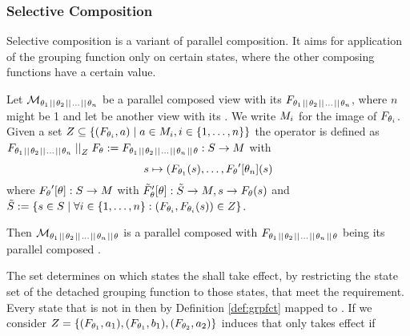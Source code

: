 \documentclass[preview]{standalone}
\begin{document}
\subsubsection{Selective Composition} \label{subsec:selecitvecomp}
Selective composition is a variant of parallel composition. It aims for application of the grouping function only on certain states, where the other composing functions have a certain value.


\begin{definition}
	Let $\view[\viewppty_1 \pll \viewppty_2 \pll \dots \pll 
	\viewppty_n]$ be a parallel composed view with its \grpfctN $\grpfct[{\viewppty_1 \pll \viewppty_2 \pll \dots \pll \viewppty_n}]$, where $n$ might be 1 and let \view be another view with its \grpfctN \grpfct. 
	We write $\imggrp_i$ for the image of $\grpfct[\viewppty_i]$. 
	Given a set $\compselectset \subseteq \{ (\grpfct[\viewppty_i], a) \mid a \in \imggrp_i, i \in \{1, \dots, n\}\}$ the operator \compselectpure is defined as $\grpfct[{\viewppty_1 \pll \viewppty_2 \pll \dots \pll \viewppty_n}] \compselect \grpfct := \grpfct[{\viewppty_1 \pll \viewppty_2 \pll \dots \pll \viewppty_n} \pll \viewppty]: \states \to \arbset$ with
	\[
	\state \mapsto (\grpfct[\viewppty_1](\state), \dots, \grpfct'[\viewppty_n](\state)
	\]
	where $\grpfct'[\viewppty] : \states \to \imggrp$ with $\grpfctsub'[\viewppty] : \smstates \to \imggrp, \state \to \grpfct(\state)$ and $\smstates := \{\state \in \states \mid \forall i \in \{1, \dots, n\} : (\grpfct[\viewppty_i], \grpfct[\viewppty_i](\state)) \in \compselectset\}$.
	
	
	
	\noindent
	Then $\view[\viewppty_1 \pll \viewppty_2 \pll \dots \pll 
	\viewppty_n \pll \viewppty]$ is a parallel composed \viewN with $\grpfct[{\viewppty_1 \pll \viewppty_2 \pll \dots \pll \viewppty_n} \pll \viewppty]$ being its parallel composed \grpfctN.
	\label{def:compositionselective}
\end{definition}

The set \compselectset determines on which states the \viewN \view shall take effect, by restricting the state set \smstates of the detached grouping function to those states, that meet the requirement. Every state that is not in \smstates then by Definition \ref{def:grpfct} mapped to \remelem. If we consider $\compselectset = \{(\grpfct[\viewppty_1], a_1),(\grpfct[\viewppty_1], b_1), (\grpfct[\viewppty_2], a_2)\}$ induces that \view only takes effect if 
\end{document}
